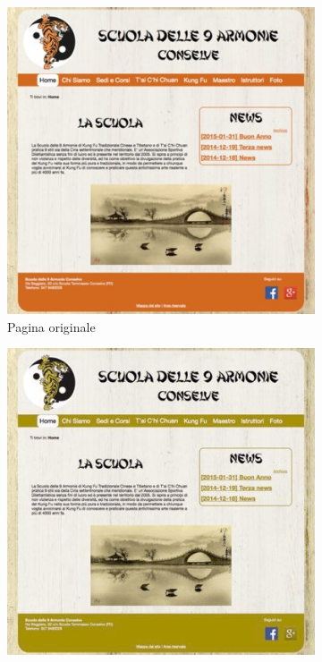 \begin{figure}
\centering
\begin{subfigure}{.5\textwidth}
  \centering
  \includegraphics[width=.9\linewidth]{../immagini/originale.jpg}
  \caption{Pagina originale}
  \label{fig:sub1}
\end{subfigure}%
\begin{subfigure}{.5\textwidth}
  \centering
  \includegraphics[width=.9\linewidth]{../immagini/deutranope.jpg}

\end{subfigure}
\end{figure}
